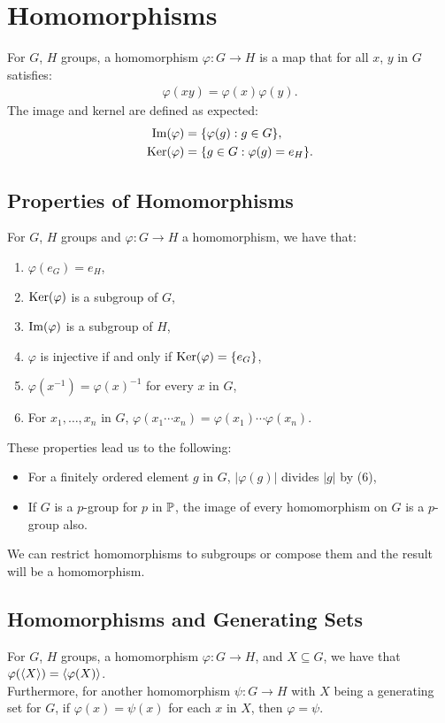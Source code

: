 \section{Homomorphisms}

For $G$, $H$ groups, a homomorphism $\varphi : G \to H$ is a map that 
for all $x$, $y$ in $G$ satisfies:
\begin{align*}
    \varphi(xy) = \varphi(x)\varphi(y).
\end{align*} The image and kernel are defined as expected: \begin{align*}
    \operatorname{Im}(\varphi) &= \{\varphi(g) : g \in G\}, \\
    \operatorname{Ker}(\varphi) &= \{g \in G : \varphi(g) = e_H\}.
\end{align*}

\subsection{Properties of Homomorphisms}

For $G$, $H$ groups and $\varphi : G \to H$ a homomorphism, we have that:
\begin{enumerate}
    \item $\varphi(e_G) = e_H$,
    \item $\operatorname{Ker}(\varphi)$ is a subgroup of $G$,
    \item $\operatorname{Im}(\varphi)$ is a subgroup of $H$,
    \item $\varphi$ is injective if and only if $\operatorname{Ker}(\varphi) = \{e_G\}$,
    \item $\varphi(x^{-1}) = \varphi(x)^{-1}$ for every $x$ in $G$,
    \item For $x_1, \ldots, x_n$ in $G$,
        $\varphi(x_1 \cdots x_n) = \varphi(x_1) \cdots \varphi(x_n)$.
\end{enumerate} These properties lead us to the following: \begin{itemize}
    \item For a finitely ordered element $g$ in $G$, $|\varphi(g)|$
        divides $|g|$ by (6),
    \item If $G$ is a $p$-group for $p$ in $\mathbb{P}$, the image of every
        homomorphism on $G$ is a $p$-group also.
\end{itemize} We can restrict homomorphisms to subgroups or compose them
and the result will be a homomorphism.

\subsection{Homomorphisms and Generating Sets} \label{2.7}

For $G$, $H$ groups, a homomorphism $\varphi : G \to H$, and $X \subseteq G$,
we have that \linebreak $\varphi({\langle X \rangle}) = {\langle \varphi(X) \rangle}$.
\\[\baselineskip]
Furthermore, for another homomorphism $\psi : G \to H$ with $X$ being
a generating set for $G$, if $\varphi(x) = \psi(x)$ for each $x$ in $X$,
then $\varphi = \psi$.
